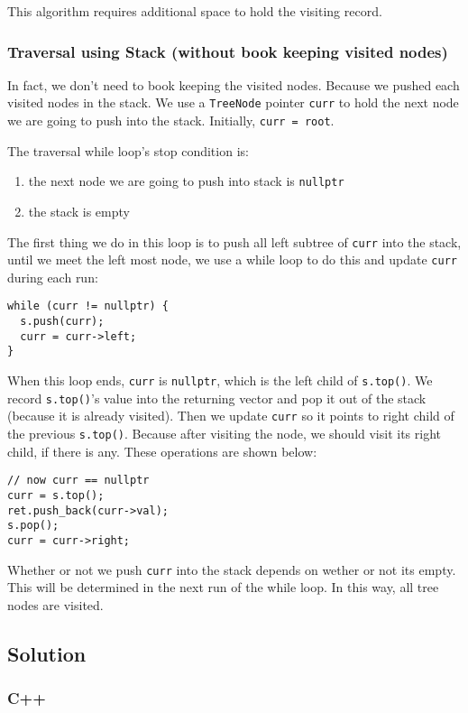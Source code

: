 \documentclass[11pt]{article}
\begin{document}
This algorithm requires additional space to hold the visiting record.
\subsubsection{Traversal using Stack (without book keeping visited nodes)}
\label{sec:org3982a92}
In fact, we don't need to book keeping the visited nodes. Because we pushed each visited nodes in the stack. We use a \texttt{TreeNode} pointer \texttt{curr} to hold the next node we are going to push into the stack. Initially, \texttt{curr = root}.

The traversal while loop's stop condition is:
\begin{enumerate}
\item the next node we are going to push into stack is \texttt{nullptr}
\item the stack is empty
\end{enumerate}

The first thing we do in this loop is to push all left subtree of \texttt{curr} into the stack, until we meet the left most node, we use a while loop to do this and update \texttt{curr} during each run:
\begin{verbatim}
while (curr != nullptr) {
  s.push(curr);
  curr = curr->left;
}
\end{verbatim}
When this loop ends, \texttt{curr} is \texttt{nullptr}, which is the left child of \texttt{s.top()}. We record \texttt{s.top()}'s value into the returning vector and pop it out of the stack (because it is already visited). Then we update \texttt{curr} so it points to right child of the previous \texttt{s.top()}. Because after visiting the node, we should visit its right child, if there is any. These operations are shown below:
\begin{verbatim}
// now curr == nullptr
curr = s.top();
ret.push_back(curr->val);
s.pop();
curr = curr->right;
\end{verbatim}
Whether or not we push \texttt{curr} into the stack depends on wether or not its empty. This will be determined in the next run of the while loop. In this way, all tree nodes are visited.

\subsection{Solution}
\label{sec:org3627169}
\subsubsection{C++}
\label{sec:orgda822fe}
\end{document}
